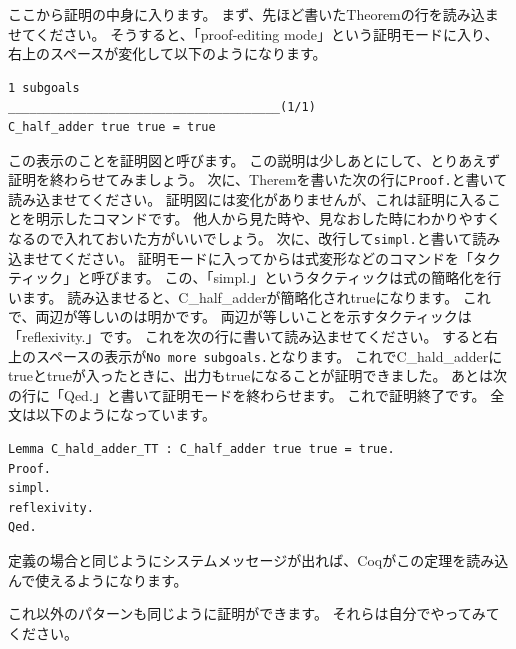 \documentclass{jsbook}
\begin{document}
ここから証明の中身に入ります。
まず、先ほど書いたTheoremの行を読み込ませてください。
そうすると、「proof-editing mode」という証明モードに入り、
右上のスペースが変化して以下のようになります。
\begin{verbatim}
1 subgoals
______________________________________(1/1)
C_half_adder true true = true
\end{verbatim}
この表示のことを証明図と呼びます。
この説明は少しあとにして、とりあえず証明を終わらせてみましょう。
次に、Theremを書いた次の行に\verb|Proof.|と書いて読み込ませてください。
証明図には変化がありませんが、これは証明に入ることを明示したコマンドです。
他人から見た時や、見なおした時にわかりやすくなるので入れておいた方がいいでしょう。
次に、改行して\verb|simpl.|と書いて読み込ませてください。
証明モードに入ってからは式変形などのコマンドを「タクティック」と呼びます。
この、「simpl.」というタクティックは式の簡略化を行います。
読み込ませると、C\_half\_adderが簡略化されtrueになります。
これで、両辺が等しいのは明かです。
両辺が等しいことを示すタクティックは「reflexivity.」です。
これを次の行に書いて読み込ませてください。
すると右上のスペースの表示が\verb|No more subgoals.|となります。
これでC\_hald\_adderにtrueとtrueが入ったときに、出力もtrueになることが証明できました。
あとは次の行に「Qed.」と書いて証明モードを終わらせます。
これで証明終了です。
全文は以下のようになっています。
\begin{verbatim}
Lemma C_hald_adder_TT : C_half_adder true true = true.
Proof.
simpl.
reflexivity.
Qed.
\end{verbatim}
定義の場合と同じようにシステムメッセージが出れば、Coqがこの定理を読み込んで使えるようになります。

これ以外のパターンも同じように証明ができます。
それらは自分でやってみてください。
\end{document}
